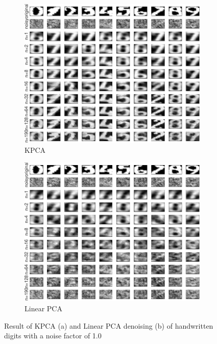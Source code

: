 \documentclass{article}
\begin{document}
        \begin{figure}[h]
             \centering
             \begin{subfigure}[b]{0.3\textwidth}
                 \centering
                 \includegraphics[width=\textwidth]{Assignment 3/figures/2_1/KPCA.pdf}
                 \caption{KPCA}
                 \label{fig:kpca}
             \end{subfigure}
            \hfill
             \begin{subfigure}[b]{0.3\textwidth}
                 \centering
                 \includegraphics[width=\textwidth]{Assignment 3/figures/2_1/Linear_PCA.pdf}
                 \caption{Linear PCA}
                 \label{fig:lin_pca}
             \end{subfigure}
            \caption{Result of KPCA (a) and Linear PCA denoising (b) of handwritten digits with a noise factor of 1.0}
        \end{figure}
    
\end{document}
